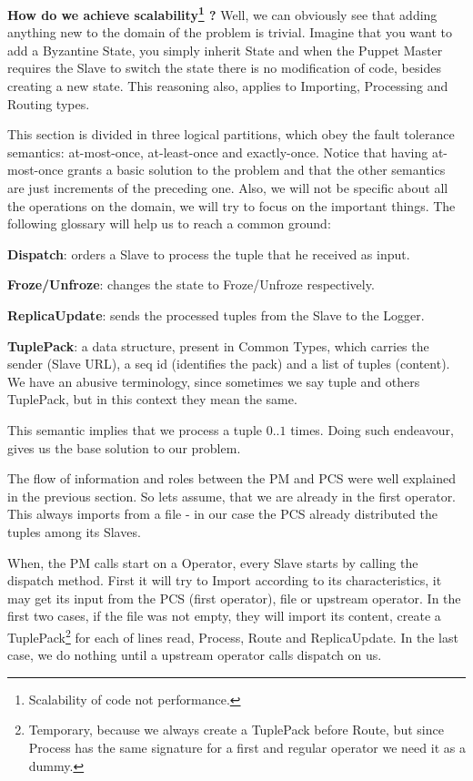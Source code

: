 \documentclass[times, 10pt,twocolumn]{article}
\begin{document}
\textbf{How do we achieve scalability\footnote{%
		Scalability of code not performance.
	} 
	?} Well, we can obviously see that adding anything new to the domain of the problem is trivial. Imagine that you want to add a Byzantine State, you simply inherit State and when the Puppet Master requires the Slave to switch the state there is no modification of code, besides creating a new state. This reasoning also, applies to Importing, Processing and Routing types.



This section is divided in three logical partitions, which obey the fault tolerance semantics: at-most-once, at-least-once and exactly-once. Notice that having at-most-once grants a basic solution to the problem and that the other semantics are just increments of the preceding one. Also, we will not be specific about all the operations on the domain, we will try to focus on the important things. The following glossary will help us to reach a common ground:

\textbf{Dispatch}: orders a Slave to process the tuple that he received as input.

\textbf{Froze/Unfroze}: changes the state to Froze/Unfroze respectively.

\textbf{ReplicaUpdate}: sends the processed tuples from the Slave to the Logger.

\textbf{TuplePack}: a data structure, present in Common Types, which carries the sender (Slave URL), a seq id (identifies the pack) and a list of tuples (content). We have an abusive terminology, since sometimes we say tuple and others TuplePack, but in this context they mean the same.


This semantic implies that we process a tuple $0..1$ times. Doing such endeavour, gives us the base solution to our problem.

The flow of information and roles between the PM and PCS were well explained in the previous section. So lets assume, that we are already in the first operator. This always imports from a file - in our case the PCS already distributed the tuples among its Slaves. 

When, the PM calls start on a Operator, every Slave starts by calling the dispatch method. First it will try to Import according to its characteristics, it may get its input from the PCS (first operator), file or upstream operator. In the first two cases, if the file was not empty, they will import its content, create a TuplePack\footnote
{%
	Temporary, because we always create a TuplePack before Route, but since Process has the same signature for a first and regular operator we need it as a dummy.
} 
for each of lines read, Process, Route and ReplicaUpdate. In the last case, we do nothing until a upstream operator calls dispatch on us.
\end{document}
